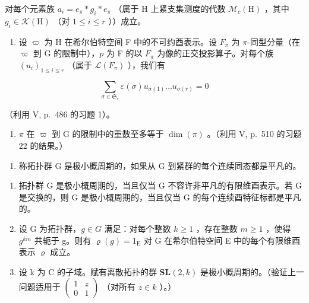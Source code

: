 对每个元素族 \(a_{i}=e_{\pi}*g_{i}*e_{\pi}\) （属于 H 上紧支集测度的代数 \(\mathcal{M}_{c}(\mathrm{H})\) ，其中 \(g_{i}\in\mathcal{K}(\mathrm{H})\) （对 \(1\leqslant i\leqslant r\) ））成立。

\begin{enumerate}
\def\labelenumi{\alph{enumi})}
\setcounter{enumi}{2}
\tightlist
\item
  设 \(\varpi\) 为 H 在希尔伯特空间 F 中的不可约酉表示。设 \(F_{\pi}\) 为 \(\pi\)-同型分量（在 \(\varpi\) 到 G 的限制中），\(p\) 为 F 的以 \(F_{\pi}\) 为像的正交投影算子。对每个族 \((u_i)_{1 \leqslant i \leqslant r}\) （属于 \(\mathcal{L}(F_{\pi})\) ），我们有
\end{enumerate}

\[
\sum_ {\sigma \in \mathfrak {S} _ {r}} \varepsilon (\sigma) u _ {\sigma (1)} \dots u _ {\sigma (r)} = 0
\]

  （利用 V, p.~486 的习题 1）。

\begin{enumerate}
\def\labelenumi{\alph{enumi})}
\setcounter{enumi}{3}
\tightlist
\item
  \(\pi\) 在 \(\varpi\) 到 G 的限制中的重数至多等于 \(\dim(\pi)\) 。（利用 V, p.~510 的习题 22 的结果。）
\end{enumerate}

\begin{enumerate}
\def\labelenumi{\arabic{enumi})}
\setcounter{enumi}{23}
\tightlist
\item
  称拓扑群 G 是极小概周期的，如果从 G 到紧群的每个连续同态都是平凡的。
\end{enumerate}

\begin{enumerate}
\def\labelenumi{\alph{enumi})}
\item
  拓扑群 G 是极小概周期的，当且仅当 G 不容许非平凡的有限维酉表示。若 G 是交换的，则 G 是极小概周期的，当且仅当 G 的每个连续酉特征标都是平凡的。
\item
  设 G 为拓扑群，\(g \in G\) 满足：对每个整数 \(k \geqslant 1\) ，存在整数 \(m \geqslant 1\) ，使得 \(g^{km}\) 共轭于 g。则有 \(\varrho(g) = 1_{\mathrm{E}}\) 对 G 在希尔伯特空间 E 中的每个有限维酉表示 \(\varrho\) 成立。
\item
  设 k 为 C 的子域。赋有离散拓扑的群 \(\mathbf{SL}(2,k)\) 是极小概周期的。（验证上一问题适用于 \(\begin{pmatrix}1 & z \\ 0 & 1\end{pmatrix}\) （对所有 \(z \in k\) ）。）
\end{enumerate}

